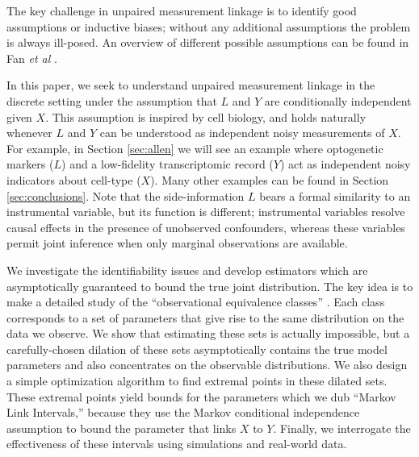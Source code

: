 \documentclass{article}
\theoremstyle{definition}
\begin{document}
The key challenge in unpaired measurement linkage is to identify good assumptions or inductive biases; without any additional assumptions the problem is always ill-posed.  An overview of different possible assumptions can be found in Fan \emph{et al} \cite{FanYan2017}.  

In this paper, we seek to understand unpaired measurement linkage in the discrete setting under the assumption that $L$ and $Y$ are conditionally independent given $X$.  This assumption is inspired by cell biology, and holds naturally whenever $L$ and $Y$ can be understood as independent noisy measurements of $X$.  For example, in Section \ref{sec:allen} we will see an example where optogenetic markers ($L$) and a low-fidelity transcriptomic record ($Y$) act as independent noisy indicators about cell-type ($X$).  Many other examples can be found in Section \ref{sec:conclusions}.  Note that the side-information $L$ bears a formal similarity to an instrumental variable, but its function is different; instrumental variables resolve causal effects in the presence of unobserved confounders, whereas these variables permit joint inference when only marginal observations are available. 

We investigate the identifiability issues and develop estimators which are asymptotically guaranteed to bound the true joint distribution.  The key idea is to make a detailed study of the ``observational equivalence classes'' \cite{paulino1994identifiability,hauser2012characterization,tong1991indeterminacy}.  Each class corresponds to a set of parameters that give rise to the same distribution on the data we observe.  We show that estimating these sets is actually impossible, but a carefully-chosen dilation of these sets asymptotically contains the true model parameters and also concentrates on the observable distributions.  We also design a simple optimization algorithm to find extremal points in these dilated sets.  These extremal points yield bounds for the parameters which we dub ``Markov Link Intervals,'' because they use the Markov conditional independence assumption to bound the parameter that links $X$ to $Y$.   Finally, we interrogate the effectiveness of these intervals using simulations and real-world data. 
\end{document}
